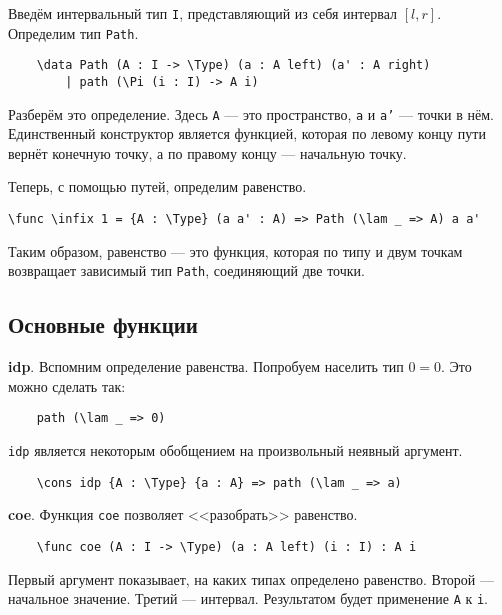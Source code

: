 Введём интервальный тип \texttt{I}, представляющий из себя интервал $[l, r]$.
Определим тип \texttt{Path}.

\begin{verbatim}
    \data Path (A : I -> \Type) (a : A left) (a' : A right)
        | path (\Pi (i : I) -> A i)
\end{verbatim} 

Разберём это определение. Здесь \texttt{A} --- это пространство, \texttt{a} и \texttt{a'} --- точки в нём.
Единственный конструктор является функцией, которая по левому концу пути вернёт конечную точку, а по правому концу --- начальную точку.

\newpage 

Теперь, с помощью путей, определим равенство.

\begin{verbatim}
\func \infix 1 = {A : \Type} (a a' : A) => Path (\lam _ => A) a a'
\end{verbatim}

Таким образом, равенство --- это функция, которая по типу и двум точкам возвращает
зависимый тип \texttt{Path}, соединяющий две точки.

\subsection{Основные функции}
\textbf{idp}. Вспомним определение равенства. Попробуем населить тип $0 = 0$. Это можно сделать так:

\begin{verbatim}
    path (\lam _ => 0)
\end{verbatim}

\texttt{idp} является некоторым обобщением на произвольный неявный аргумент.

\begin{verbatim}
    \cons idp {A : \Type} {a : A} => path (\lam _ => a)
\end{verbatim}

\textbf{coe}. Функция \texttt{coe} позволяет <<разобрать>> равенство.

\begin{verbatim}
    \func coe (A : I -> \Type) (a : A left) (i : I) : A i
\end{verbatim}

Первый аргумент показывает, на каких типах определено равенство. Второй --- начальное значение. Третий --- интервал.
Результатом будет применение \texttt{A} к \texttt{i}.

